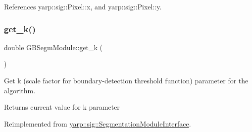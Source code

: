 \begin{DoxyCode}{0}

\end{DoxyCode}


References yarp\+::sig\+::\+Pixel\+::x, and yarp\+::sig\+::\+Pixel\+::y.

\mbox{\label{classGBSegmModule_a44bab99aa7a035e57a185673c040d2f6}} 
\subsubsection{\texorpdfstring{get\_k()}{get\_k()}}
{\footnotesize\ttfamily double G\+B\+Segm\+Module\+::get\+\_\+k (\begin{DoxyParamCaption}{ }\end{DoxyParamCaption})\hspace{0.3cm}{\ttfamily [virtual]}}



Get k (scale factor for boundary-\/detection threshold function) parameter for the algorithm. 

\begin{DoxyReturn}{Returns}
current value for k parameter 
\end{DoxyReturn}


Reimplemented from \mbox{\hyperlink{classyarp_1_1sig_1_1SegmentationModuleInterface_a91f3d872a48599337d1d2f365ac4c31e}{yarp\+::sig\+::\+Segmentation\+Module\+Interface}}.




